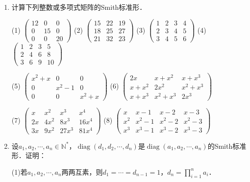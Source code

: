\documentclass[a4paper,fontset=windows]{ctexbook}
\theoremstyle{definition}
\DeclareMathOperator{\diag}{diag}
\begin{document}
\begin{enumerate}
\item 计算下列整数或多项式矩阵的Smith标准形．

(1) $\begin{pmatrix}12&0&0 \\ 0&15&0 \\ 0&0&20\end{pmatrix}$ \quad
(2) $\begin{pmatrix}15&22&19 \\ 18&25&27 \\ 21&32&23\end{pmatrix}$ \quad
(3) $\begin{pmatrix}1&2&3&4 \\ 2&3&4&5 \\ 3&4&5&6\end{pmatrix}$ \quad
(4) $\begin{pmatrix}1&2&3&5 \\ 2&4&6&8 \\ 3&6&9&10\end{pmatrix}$

(5) $\begin{pmatrix}x^2+x&0&0 \\ 0&x^2-1&0 \\ 0&0&x^2+x\end{pmatrix}$\hspace{56pt}
(6) $\begin{pmatrix}2x&x+x^2&x+x^3 \\ x+x^2&2x^2&x^2+x^3 \\ x+x^3&x^2+x^3&2x^3\end{pmatrix}$

(7) $\begin{pmatrix}x&x^2&x^3&x^4 \\ 2x&4x^2&8x^3&16x^4 \\ 3x&9x^2&27x^3&81x^4\end{pmatrix}$\hspace{64pt}
(8) $\begin{pmatrix}x&x-1&x-2&x-3 \\ x^2&x^2-1&x^2-2&x^2-3 \\ x^3&x^3-1&x^3-2&x^3-3\end{pmatrix}$

\item 设$a_1,a_2,\cdots,a_n\in\mathbb{N}^*$，$\diag(d_1,d_2,\cdots,d_n)$是$\diag(a_1,a_2,\cdots,a_n)$的Smith标准形．证明：

(1)若$a_1,a_2,\cdots,a_n$两两互素，则$d_1=\cdots=d_{n-1}=1$，$d_n=\prod\limits_{i=1}^na_i$．


\end{enumerate}
\end{document}
